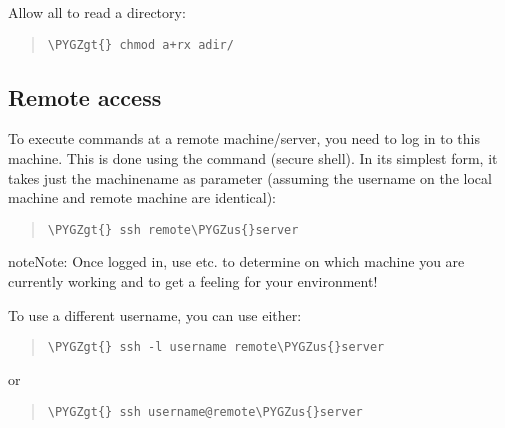 \documentclass[a4paper,11pt,english]{sphinxmanual}
\def\PYGZus{\char`\_}
\def\PYGZgt{\char`\>}
\begin{document}
Allow all to read a directory:
\begin{quote}

\begin{Verbatim}[frame=single, rulecolor=\color{lightgray}, fontfamily=courier, commandchars=\\\{\}]
\PYGZgt{} chmod a+rx adir/
\end{Verbatim}
\end{quote}


\subsection{Remote access}
\label{introduction:remote-access}
To execute commands at a remote machine/server, you need to log in to this machine. This is done
using the  command (secure shell). In its simplest form, it takes just the machinename as
parameter (assuming the username on the local machine and remote machine are identical):
\begin{quote}

\begin{Verbatim}[frame=single, rulecolor=\color{lightgray}, fontfamily=courier, commandchars=\\\{\}]
\PYGZgt{} ssh remote\PYGZus{}server
\end{Verbatim}
\end{quote}

\begin{notice}{note}{Note:}
Once logged in, use   etc. to
determine on which machine you are currently working and to get a feeling for your
environment!
\end{notice}

To use a different username, you can use either:
\begin{quote}

\begin{Verbatim}[frame=single, rulecolor=\color{lightgray}, fontfamily=courier, commandchars=\\\{\}]
\PYGZgt{} ssh -l username remote\PYGZus{}server
\end{Verbatim}
\end{quote}

or
\begin{quote}

\begin{Verbatim}[frame=single, rulecolor=\color{lightgray}, fontfamily=courier, commandchars=\\\{\}]
\PYGZgt{} ssh username@remote\PYGZus{}server
\end{Verbatim}
\end{quote}
\end{document}
